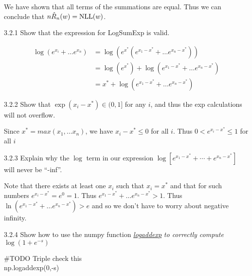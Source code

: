 \documentclass[12pt,letterpaper]{article}
\begin{document}
\begin{solution}{}
    We have shown that all terms of the summations are equal. Thus we can conclude that $n\hat{R}_{n}(w)=\text{NLL}(w)$.
\end{solution}
\newpage

\begin{problem}{3.2.1}
    Show that the expression for LogSumExp is valid.
\end{problem}
\begin{solution}{}
    \begin{align*}
        \log(e^{x_i} + \dots e^{x_n}) &= \log(e^{x^*}(e^{x_1-x^*} + \dots e^{x_n-x^*}))\\
        &= \log(e^{x^*}) + \log(e^{x_1-x^*} + \dots e^{x_n-x^*})\\
        &= x^* + \log(e^{x_1-x^*} + \dots e^{x_n-x^*})
    \end{align*}
\end{solution}
\newpage

\begin{problem}{3.2.2}
    Show that $\exp\left(x_{i}-x^{*}\right)\in(0,1]$ for any $i$, and thus the exp calculations will not overflow.
\end{problem}
\begin{solution}{}
    Since $x^*=max(x_1, \dots x_n)$, we have $x_i-x^*\leq 0$ for all $i$. Thus $0<e^{x_i-x^*}\leq1$ for all $i$
\end{solution}
\newpage

\begin{problem}{3.2.3}
    Explain why the $\log$ term in our expression
    $\log\left[e^{x_{1}-x^{*}}+\cdots+e^{x_{n}-x^{*}}\right]$ will never
    be ``-inf''.
\end{problem}
\begin{solution}{}
    Note that there exists at least one $x_i$ such that $x_i=x^*$ and that for such numbers $e^{x_i-x^*}=e^0=1$. 
    Thus $e^{x_1-x^*} + \dots e^{x_n-x^*} > 1$. Thus $\ln(e^{x_1-x^*} + \dots e^{x_n-x^*}) > e$ and so we don't have to worry
    about negative infinity.
\end{solution}
\newpage

\begin{problem}{3.2.4}
    Show how to use the numpy function\textit{ \href{https://docs.scipy.org/doc/numpy/reference/generated/numpy.logaddexp.html}{logaddexp}
    }\textit{\emph{to correctly compute $\log\left(1+e^{-s}\right)$}}
\end{problem}
\begin{solution}{}
    #TODO Triple check this\\
    np.logaddexp(0,-s)
\end{solution}
\newpage
\end{document}
